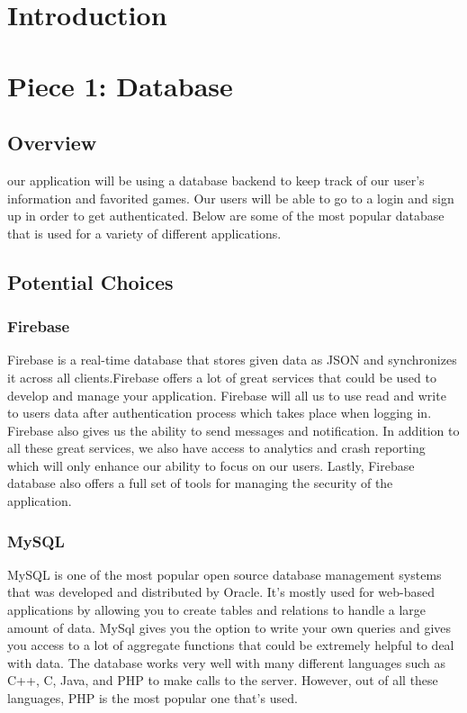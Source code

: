 \documentclass[onecolumn, draftclsnofoot,10pt, compsoc]{IEEEtran}
\begin{document}
\newpage
{}
\tableofcontents
\clearpage

\section{Introduction}
\section{Piece 1: Database}
\subsection{Overview}
\par our application will be using a database backend to keep track of our user's information and favorited games. Our users will be able to go to a login and sign up in order to get authenticated. Below are some of the most popular database that is used for a variety of different applications. 
\subsection{Potential Choices}

\subsubsection{Firebase\cite{Firebase}}
Firebase is a real-time database that stores given data as JSON and synchronizes it across all clients.Firebase offers a lot of great services that could be used to develop and manage your application. Firebase will all us to use read and write to users data after authentication process which takes place when logging in. Firebase also gives us the ability to send messages and notification. In addition to all these great services, we also have access to analytics and crash reporting which will only enhance our ability to focus on our users. Lastly, Firebase database also offers a full set of tools for managing the security of the application.

\subsubsection{MySQL\cite{MySql}}
MySQL is one of the most popular open source database management systems that was developed and distributed by Oracle. It's mostly used for web-based applications by allowing you to create tables and relations to handle a large amount of data. MySql gives you the option to write your own queries and gives you access to a lot of aggregate functions that could be extremely helpful to deal with data. The database works very well with many different languages such as C++, C, Java, and PHP to make calls to the server. However, out of all these languages, PHP is the most popular one that's used.
\end{document}
